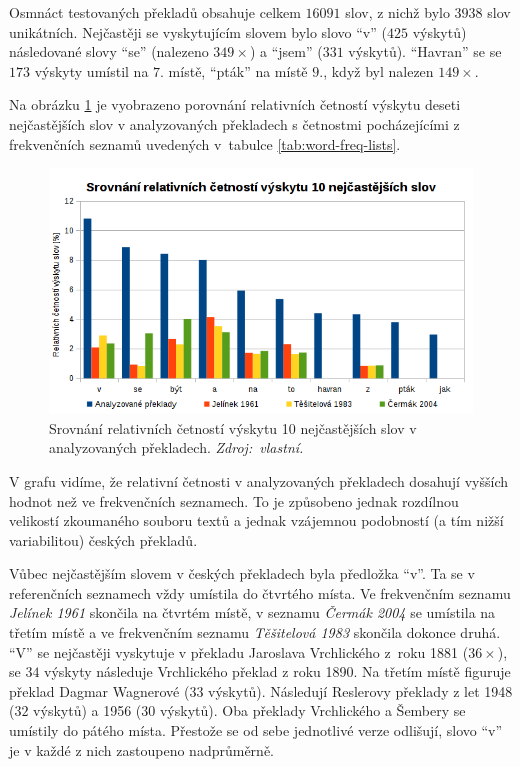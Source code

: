 \documentclass[dp.tex]{subfiles}
\begin{document}
Osmnáct testovaných překladů obsahuje celkem $16 091$ slov, z nichž bylo $3938$ slov unikátních. Nejčastěji se vyskytujícím slovem bylo slovo \enquote{v} ($425$ výskytů) následované slovy \enquote{se} (nalezeno $349\times$) a \enquote{jsem} ($331$ výskytů). \enquote{Havran} se se $173$ výskyty umístil na $7.$ místě, \enquote{pták} na místě $9.$, když byl nalezen $149\times$.

Na obrázku \ref{fig:word-freq} je vyobrazeno porovnání relativních četností výskytu deseti nejčastějších slov v analyzovaných překladech s četnostmi pocházejícími z frekvenčních seznamů uvedených v~tabulce \ref{tab:word-freq-lists}.

\begin{figure}[h!]
	\centering
	\includegraphics[max width=\textwidth,keepaspectratio=true]{imgs-70-prakticka/cetnost-slov}
	\caption[Srovnání relativních četností výskytu 10 nejčastějších slov v analyzovaných překladech.]{Srovnání relativních četností výskytu 10 nejčastějších slov v analyzovaných překladech. \textit{Zdroj:~vlastní.}}
	\label{fig:word-freq}
\end{figure}

V grafu vidíme, že relativní četnosti v analyzovaných překladech dosahují vyšších hodnot než ve frekvenčních seznamech. To je způsobeno jednak rozdílnou velikostí zkoumaného souboru textů a jednak vzájemnou podobností (a tím nižší variabilitou) českých překladů. 

Vůbec nejčastějším slovem v českých překladech byla předložka \enquote{v}. Ta se v referenčních seznamech vždy umístila do čtvrtého místa. Ve frekvenčním seznamu \textit{Jelínek 1961} skončila na čtvrtém místě, v seznamu \textit{Čermák 2004} se umístila na třetím místě a ve frekvenčním seznamu \textit{Těšitelová 1983} skončila dokonce druhá. \enquote{V} se nejčastěji vyskytuje v překladu Jaroslava Vrchlického z~roku 1881 ($36\times$), se $34$ výskyty následuje Vrchlického překlad z roku 1890. Na třetím místě figuruje překlad Dagmar Wagnerové ($33$ výskytů). Následují Reslerovy překlady z let 1948 ($32$ výskytů) a 1956 ($30$ výskytů). Oba překlady Vrchlického a Šembery se umístily do pátého místa. Přestože se od sebe jednotlivé verze odlišují, slovo \enquote{v} je v každé z nich zastoupeno nadprůměrně.
\end{document}
